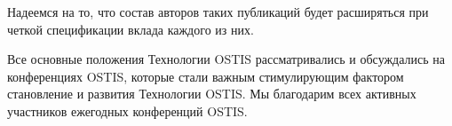 \begin{SCn}
{Надеемся на то, что состав авторов таких публикаций будет расширяться при четкой спецификации вклада каждого из них. 

Все основные положения Технологии OSTIS рассматривались и обсуждались на конференциях OSTIS, которые стали важным стимулирующим фактором становление и развития Технологии OSTIS. Мы благодарим всех активных участников ежегодных конференций OSTIS.
}

\scnendstruct

\end{SCn}
